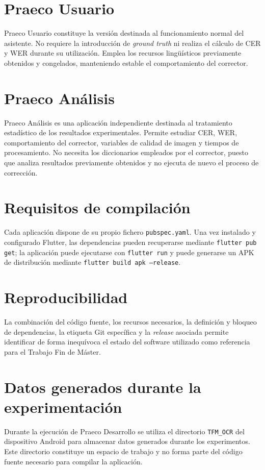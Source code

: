 \section{Praeco Usuario}
Praeco Usuario constituye la versión destinada al funcionamiento normal del asistente. No requiere la introducción de \textit{ground truth} ni realiza el cálculo de CER y WER durante su utilización. Emplea los recursos lingüísticos previamente obtenidos y congelados, manteniendo estable el comportamiento del corrector.

\section{Praeco Análisis}
Praeco Análisis es una aplicación independiente destinada al tratamiento estadístico de los resultados experimentales. Permite estudiar CER, WER, comportamiento del corrector, variables de calidad de imagen y tiempos de procesamiento. No necesita los diccionarios empleados por el corrector, puesto que analiza resultados previamente obtenidos y no ejecuta de nuevo el proceso de corrección.

\section{Requisitos de compilación}
Cada aplicación dispone de su propio fichero \texttt{pubspec.yaml}. Una vez instalado y configurado Flutter, las dependencias pueden recuperarse mediante \texttt{flutter pub get}; la aplicación puede ejecutarse con \texttt{flutter run} y puede generarse un APK de distribución mediante \texttt{flutter build apk --release}.

\section{Reproducibilidad}
La combinación del código fuente, los recursos necesarios, la definición y bloqueo de dependencias, la etiqueta Git específica y la \textit{release} asociada permite identificar de forma inequívoca el estado del software utilizado como referencia para el Trabajo Fin de Máster.

\section{Datos generados durante la experimentación}
Durante la ejecución de Praeco Desarrollo se utiliza el directorio \texttt{TFM\_OCR} del dispositivo Android para almacenar datos generados durante los experimentos. Este directorio constituye un espacio de trabajo y no forma parte del código fuente necesario para compilar la aplicación.

